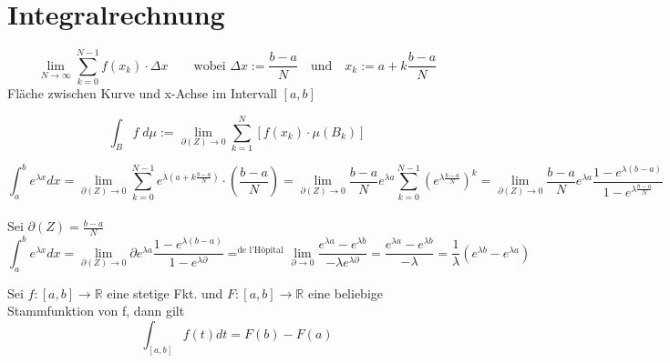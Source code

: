 \documentclass[a4paper]{article}
\begin{document}
\newpage
\section{Integralrechnung}
	\begin{fdef}
		$$\lim \limits_{N \to \infty} \sum \limits_{k=0}^{N-1} f(x_k) \cdot \Delta x \qquad \text{wobei } \Delta x := \frac{b-a}{N} \quad \text{und} \quad x_k := a + k \frac{b-a}{N}$$
		Fläche zwischen Kurve und x-Achse im Intervall $[a,b]$
	\end{fdef}

	\begin{fdef}
		$$\int_B f \; d \mu := \lim_{\partial (Z) \to 0} \sum_{k=1}^N \left [ f(x_k) \cdot \mu(B_k) \right ]$$
	\end{fdef}
	\begin{fmerke}
	\small
		$$\int_a^b e^{\lambda x} dx = \lim_{\partial (Z) \to 0} \sum_{k=0}^{N-1} e^{\lambda(a+ k \frac{b-a}{N})}\cdot \left( \frac{b-a}{N} \right) = \lim_{\partial (Z) \to 0} \frac{b-a}{N} e^{\lambda a} \sum_{k=0}^{N-1} \left( e^{\lambda \frac{b-a}{N}} \right) ^k = \lim_{\partial (Z) \to 0} \frac{b-a}{N} e^{\lambda a} \frac{1 - e^{\lambda(b-a)}}{1- e^{\lambda \frac{b-a}{N}}}$$\\[-3.2mm]
		\small
		Sei $\partial (Z) = \frac{b-a}{N}$
			\vspace{-3mm}
		\small
		$$\int_a^b e^{\lambda x} dx =
			\lim_{\partial (Z) \to 0} \partial e^{\lambda a} \frac{1-e^{\lambda(b-a)}}{1 - e^{\lambda \partial}}
			=^{\text{de l'H\^{o}pital}} \lim_{\partial \to 0} \frac{e^{\lambda a} - e^{\lambda b}}{- \lambda e^{\lambda \partial}}
			= \frac{e^{\lambda a}- e^{\lambda b}}{- \lambda}
			= \frac{1}{\lambda} \left( e^{\lambda b} - e^{\lambda a} \right)
			$$
	\end{fmerke}

	\begin{fsatz}
	Sei $f: [a, b] \to \mathbb{R}$ eine stetige Fkt. und $F: [a,b] \to \mathbb{R}$ eine beliebige Stammfunktion von f, dann gilt\\[-3mm]
	$$\int_{[a, b]} f(t) dt = F(b) - F(a)$$\\[-7mm]
	\end{fsatz}
\end{document}
